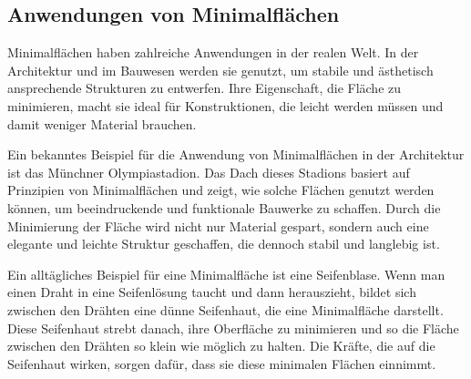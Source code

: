 \subsection{Anwendungen von Minimalflächen
	\label{minimalflaechen:subsection:Anwendungen von Minimalflächen}}
Minimalflächen haben zahlreiche Anwendungen in der realen Welt.
In der Architektur und im Bauwesen werden sie genutzt, um stabile und ästhetisch ansprechende Strukturen zu entwerfen.
Ihre Eigenschaft, die Fläche zu minimieren, macht sie ideal für Konstruktionen, die leicht werden müssen und damit weniger Material brauchen.

Ein bekanntes Beispiel für die Anwendung von Minimalflächen in der Architektur ist das Münchner Olympiastadion.
Das Dach dieses Stadions basiert auf Prinzipien von Minimalflächen und zeigt, wie solche Flächen genutzt werden können, um beeindruckende und funktionale Bauwerke zu schaffen.
Durch die Minimierung der Fläche wird nicht nur Material gespart, sondern auch eine elegante und leichte Struktur geschaffen, die dennoch stabil und langlebig ist.

Ein alltägliches Beispiel für eine Minimalfläche ist eine Seifenblase.
Wenn man einen Draht in eine Seifenlösung taucht und dann herauszieht, bildet sich zwischen den Drähten eine dünne Seifenhaut, die eine Minimalfläche darstellt.
Diese Seifenhaut strebt danach, ihre Oberfläche zu minimieren und so die Fläche zwischen den Drähten so klein wie möglich zu halten.
Die Kräfte, die auf die Seifenhaut wirken, sorgen dafür, dass sie diese minimalen Flächen einnimmt.

